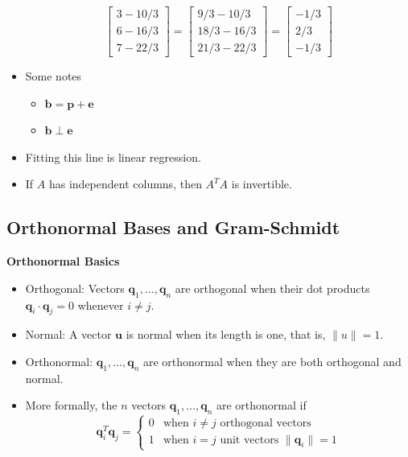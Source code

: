\documentclass[11pt]{article}
\begin{document}
\begin{itemize}
\[\begin{bmatrix}
        3 - 10/3 \\
        6 - 16/3 \\
        7 - 22/3
    \end{bmatrix} =
    \begin{bmatrix}
        9/3 - 10/3 \\
        18/3 - 16/3 \\
        21/3 - 22/3
    \end{bmatrix} =
    \begin{bmatrix}
        -1/3 \\
        2/3 \\
        -1/3
    \end{bmatrix}
    \]
    \item Some notes
    \begin{itemize}
        \item $\boldsymbol{b} = \boldsymbol{p} + \boldsymbol{e}$
        \item $\boldsymbol{b} \perp \boldsymbol{e}$
    \end{itemize}
    \item Fitting this line is linear regression. 
    \item If $A$ has independent columns, then $A^T A$ is invertible.
\end{itemize}

\subsection{Orthonormal Bases and Gram-Schmidt}

\textbf{Orthonormal Basics}
\begin{itemize}
    \item Orthogonal: Vectors $\boldsymbol{q}_1, \ldots, \boldsymbol{q}_n$ are orthogonal when
    their dot products $\boldsymbol{q}_i \cdot \boldsymbol{q}_j = 0$ whenever $i \ne j$.
    \item Normal: A vector $\boldsymbol{u}$ is normal when its length is one, that is, $\| u 
    \| = 1$.
    \item Orthonormal: $\boldsymbol{q}_1, \ldots, \boldsymbol{q}_n$ are orthonormal when they 
    are both orthogonal and normal.
    \item More formally, the $n$ vectors $\boldsymbol{q}_1, \ldots, \boldsymbol{q}_n$ are 
    orthonormal if 
    \[ \boldsymbol{q}_i^T \boldsymbol{q}_j = \begin{cases} 
        0 & \text{when } i \ne j \text{\ \ \ orthogonal vectors} \\
        1 & \text{when } i = j \text{\ \ \ unit vectors } \|\boldsymbol{q}_i\| = 1
     \end{cases}
    \]
\end{itemize}
\end{document}

